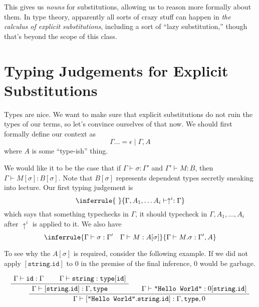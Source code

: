 \documentclass{article}
\newcommand{\type}{\ensuremath{\mathtt{type}}}
\newcommand{\id}{\ensuremath{\mathtt{id}}}
\begin{document}
This gives us \textit{nouns} for substitutions, allowing us to reason more
formally about them. In type theory, apparently all sorts of crazy stuff can
happen in \textit{the calculus of explicit substitutions}, including a sort of
``lazy substitution,'' though that's beyond the scope of this class.

\section{Typing Judgements for Explicit Substitutions}

Types are nice. We want to make sure that explicit substitutions do not ruin the
types of our terms, so let's convince ourselves of that now. We should first
formally define our context as
\[
\Gamma \dots= \epsilon \mid \Gamma, A
\]
where $A$ is some ``type-ish'' thing.

We would like it to be the case that if $\Gamma \vdash \sigma : \Gamma'$ and
$\Gamma' \vdash M : B$, then $\Gamma \vdash M[\sigma] : B[\sigma]$. Note that
$B[\sigma]$ represents dependent types secretly sneaking into lecture. Our first
typing judgement is
\[
\inferrule{
  \text{ }
}{
  \Gamma, A_1, \ldots A_i \vdash \uparrow^i : \Gamma
}
\]
which says that something typechecks in $\Gamma$, it should typecheck in
$\Gamma, A_1, \ldots, A_i$ after $\uparrow^i$ is applied to it. We also have
\[
\inferrule{
  \Gamma \vdash \sigma : \Gamma' \quad \Gamma\vdash M: A[\sigma]
}{
  \Gamma\vdash M.\sigma : \Gamma', A
}
\]

To see why the $A[\sigma]$ is required, consider the following example. If we
did not apply $[\texttt{string}.\id]$ to 0 in the premise of the final
inference, 0 would be garbage.

\begin{align*}
  \AxiomC{$\Gamma\vdash \id : \Gamma$}
  \AxiomC{$\Gamma\vdash \texttt{string}:\type[\id]$}
  \BinaryInfC{$\Gamma \vdash [\texttt{string}.\id] : \Gamma, \type$}
  \AxiomC{$\Gamma \vdash \texttt{"Hello World"} :0 [\texttt{string}.\id]$}
  \BinaryInfC{$\Gamma \vdash [\texttt{"Hello World"}.\texttt{string}.\id]:\Gamma, \type, 0$}
  \DisplayProof
\end{align*}
\end{document}
